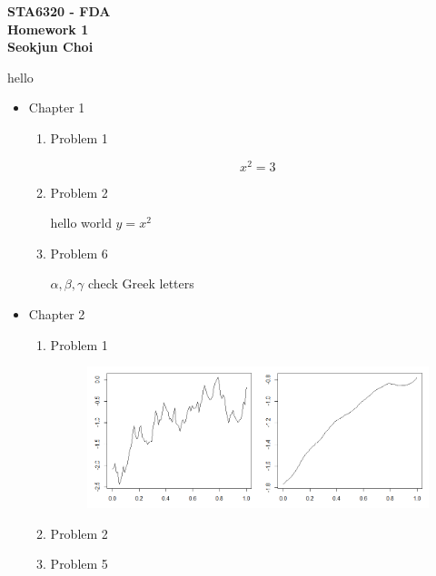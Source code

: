 \documentclass[12pt]{article}
\begin{document}
%
\baselineskip=15.5pt
\begin{center}
{\bf STA6320 - FDA} \\
{\bf Homework 1} \\
{\bf Seokjun Choi} \\
\end{center}
hello

\begin{itemize}
\item Chapter 1

\begin{enumerate}
\item Problem 1

$$x^2 = 3$$

\item Problem 2

hello world $y=x^2$ 

\item Problem 6

$\alpha, \beta, \gamma$ check Greek letters 
\end{enumerate}


\item Chapter 2
\begin{enumerate}
\item Problem 1

\begin{figure}[hh]
\centering
\includegraphics[width=1\textwidth]{mattplot.png}
\end{figure}



\item Problem 2
\item Problem 5
\end{enumerate}


\end{itemize}
\end{document}
